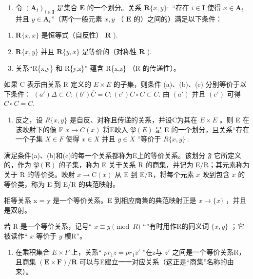 \begin{enumerate}
\def\labelenumi{\arabic{enumi}.}
\tightlist
\item
  令 \((\mathbf{A}_t)_{i \in \mathbf{I}}\) 是集合 \(\mathbf{E}\) 的一个划分。关系 \(\mathbf{R}\{x, y\} :\) “存在 \(i \in \mathbf{I}\) 使得 \(x \in \mathbf{A}_t\) 并且 \(y \in \mathbf{A}_t\)''（两个一般元素 \(x, y\) （ \(\mathbf{E}\) 的）之间的）满足以下条件：
\end{enumerate}

\begin{enumerate}
\def\labelenumi{(\alph{enumi})}
\item
  \(\mathbf{R}\{x,x\}\) 是恒等式（自反性） \(\mathbf{R}\) ).
\item
  \(\mathbf{R}\{x,y\}\) 并且 \(\mathbf{R}\{y,x\}\) 是等价的（对称性 \(\mathbf{R}\) ).
\item
  关系“R\{x,y\} 和 R\{y,z\}'' 蕴含 R\{x,z\} （R 的传递性）。
\end{enumerate}

如果 C 表示由关系 R 定义的 \(E \times E\) 的子集，则条件 (a)、(b)、(c) 分别等价于以下条件： \((a') \Delta \subset C; (b') \overline{C} = C; (c') C \circ C \subset C.\) 由 \((a')\) 并且 \((c')\) 可得 \(C \circ C = C.\)

\begin{enumerate}
\def\labelenumi{\arabic{enumi}.}
\setcounter{enumi}{1}
\tightlist
\item
  反之，设 \(R\{x,y\}\) 是自反、对称且传递的关系，并设C为其在 \(E \times E\) 。则 E 在该映射下的像 F \(x \to C(x)\) 将E映入 \(\mathfrak{P}(E)\) 是 E 的一个划分，且关系“存在一个子集 \(X \in F\) 使得 \(x \in X\) 并且 \(y \in X\) ”等价于 \(R\{x, y\}\) .
\end{enumerate}

满足条件(a)、(b)和(c)的每一个关系都称为E上的等价关系。该划分 \(\mathfrak{F}\) 它所定义的，作为 \(\mathfrak{P}(\mathbf{E})\) 的子集，称为 E 关于关系 R 的商集，并记为 E/R；其元素称为关于 R 的等价类。映射 \(x \to \mathrm{C}(x)\) 从 E 到 E/R，将每个元素 \(x\) 映到包含 \(x\) 的等价类，称为 E 到 E/R 的典范映射。

相等关系 x = y 是一个等价关系。E 到相应商集的典范映射正是 \(x \to \{x\}\) ，并且是双射。

若 R 是一个等价关系，记号“ \(x \equiv y \pmod{R}\) “”有时用作R的同义词 \(\{x, y\}\) ；它被读作“ \(x\) 等价于 \(y\) 模R”。

\begin{enumerate}
\def\labelenumi{\arabic{enumi}.}
\setcounter{enumi}{2}
\tightlist
\item
  在乘积集合 \(E \times F\) 上，关系“ \(pr_{1}z = pr_{1}z'\) ”在z与 \(z'\) 之间是一个等价关系R，且商集 \((\mathbf{E} \times \mathbf{F}) / \mathbf{R}\) 可以与E建立一一对应关系（这正是“商集”名称的由来）。
\end{enumerate}

